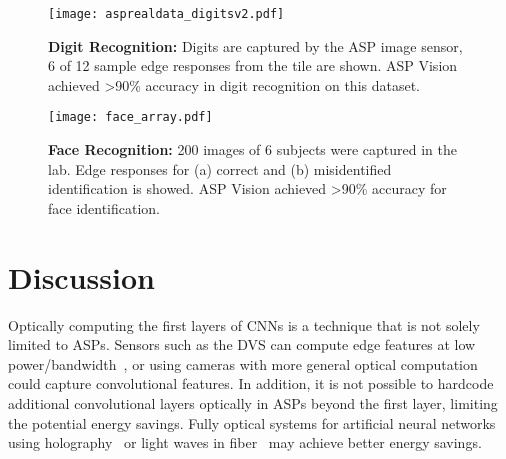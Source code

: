 \documentclass[10pt,twocolumn,letterpaper]{article}
\newcommand{\Section}[1]{\vspace{-4pt}\section{#1}\vspace{-4pt}}
\begin{document}

\begin{figure}[t]
        \begin{center}
        \texttt{[image: asprealdata\_digitsv2.pdf]}
        \end{center}
        \caption{\textbf{Digit Recognition:} Digits are captured by the ASP image sensor, 6 of 12 sample edge responses from the tile are shown. ASP Vision achieved \textgreater 90\% accuracy in digit recognition on this dataset.}
        \label{fig:digit}
    \end{figure}
    
    \begin{figure}[t]
        \begin{center}
		\texttt{[image: face\_array.pdf]} 
        \end{center}
		\caption{\textbf{Face Recognition:} 200 images of 6 subjects were captured in the lab. Edge responses for (a) correct and (b) misidentified identification is showed. ASP Vision achieved \textgreater 90\% accuracy for face identification.}        
		\label{fig:face}
    \end{figure}



\Section{Discussion}
Optically computing the first layers of CNNs is a technique that is not solely limited to ASPs. Sensors such as the DVS can compute edge features at low power/bandwidth~\cite{lichtsteiner2008128}, or using cameras with more general optical computation~\cite{zomet2006lensless} could capture convolutional features. In addition, it is not possible to hardcode additional convolutional layers optically in ASPs beyond the first layer, limiting the potential energy savings. Fully optical systems for artificial neural networks using holography~\cite{farhat1985optical, MIToptical, psaltis1990holography} or light waves in fiber~\cite{hermans2015towards} may achieve better energy savings.
\end{document}
